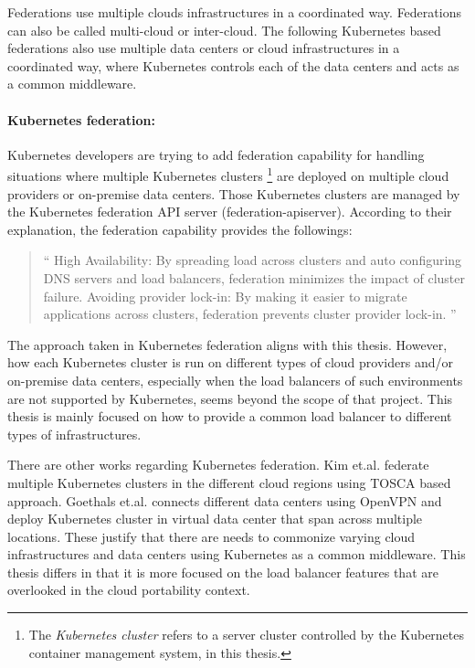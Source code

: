 Federations use multiple clouds infrastructures in a coordinated way.
Federations can also be called multi-cloud or inter-cloud.
The following Kubernetes based federations also use multiple data centers or cloud infrastructures in a coordinated way, where Kubernetes controls each of the data centers and acts as a common middleware.


\paragraph{\bf Kubernetes federation:}

Kubernetes developers are trying to add federation \cite{K8sFederation2017} capability for handling situations 
where multiple Kubernetes clusters \footnote{The {\em Kubernetes cluster} refers to a server cluster 
controlled by the Kubernetes container management system, in this thesis.} 
are deployed on multiple cloud providers or on-premise data centers. 
Those Kubernetes clusters are managed by the Kubernetes federation API server (federation-apiserver).
According to their explanation\cite{K8sFederation2017}, the federation capability provides the followings: 
\begin{quote}
\enquote{
High Availability: By spreading load across clusters and auto configuring DNS servers and load balancers, federation minimizes the impact of cluster failure.
Avoiding provider lock-in: By making it easier to migrate applications across clusters, federation prevents cluster provider lock-in.
}
\end{quote}

The approach taken in Kubernetes federation aligns with this thesis.
However, how each Kubernetes cluster is run on different types of cloud providers
and/or on-premise data centers, especially when the load balancers of such environments are not supported by Kubernetes, 
seems beyond the scope of that project.
This thesis is mainly focused on how to provide a common load balancer to different types of infrastructures.

There are other works \cite{kim2019tosca,goethals2019fuse} regarding Kubernetes federation. 
Kim et.al. \cite{kim2019tosca} federate multiple Kubernetes clusters in the different cloud regions using TOSCA \cite{standard2013topology,binz2012portable} based approach.
Goethals et.al.\cite{goethals2019fuse} connects different data centers using OpenVPN \cite{feilner2006openvpn} and deploy Kubernetes cluster in virtual data center that span across multiple locations.
These justify that there are needs to commonize varying cloud infrastructures and data centers using Kubernetes as a common middleware.
This thesis differs in that it is more focused on the load balancer features that are overlooked in the cloud portability context.

